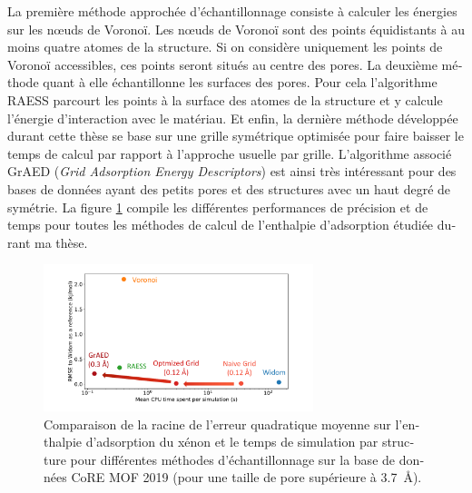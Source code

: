 \documentclass[thesis]{subfiles}
\begin{document}
\begin{otherlanguage}{french}
La première méthode approchée d'échantillonnage consiste à calculer les énergies sur les {n\oe{}uds} de Voronoï. Les n\oe{}uds de Voronoï sont des points équidistants à au moins quatre atomes de la structure. Si on considère uniquement les points de Voronoï accessibles, ces points seront situés au centre des pores. La deuxième méthode quant à elle échantillonne les surfaces des pores. Pour cela l'algorithme RAESS parcourt les points à la surface des atomes de la structure et y calcule l'énergie d'interaction avec le matériau. Et enfin, la dernière méthode développée durant cette thèse se base sur une grille symétrique optimisée pour faire baisser le temps de calcul par rapport à l'approche usuelle par grille. L'algorithme associé GrAED (\emph{Grid Adsorption Energy Descriptors}) est ainsi très intéressant pour des bases de données ayant des petits pores et des structures avec un haut degré de symétrie. La figure \ref{fgr:grid_perfomance_resume} compile les différentes performances de précision et de temps pour toutes les méthodes de calcul de l'enthalpie d'adsorption étudiée durant ma thèse.

\begin{figure}[ht]
\centering
    \includegraphics[width=0.7\textwidth]{figures/3-fastsim/Grid_sumup.pdf}
    \caption{Comparaison de la racine de l'erreur quadratique moyenne sur l'enthalpie d'adsorption du xénon et le temps de simulation par structure pour différentes méthodes d'échantillonnage  sur la base de données CoRE MOF 2019 (pour une taille de pore supérieure à \SI{3.7}{\angstrom}). }\label{fgr:grid_perfomance_resume}
\end{figure}


\end{otherlanguage}
\end{document}
